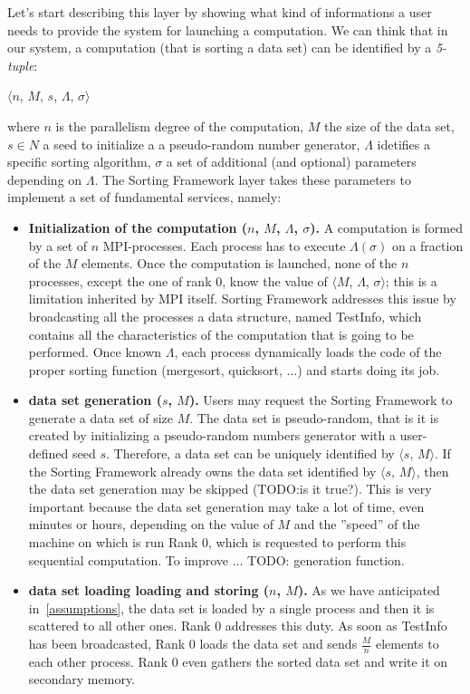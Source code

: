 Let's start describing this layer by showing what kind of informations a user needs to provide the system for launching a computation. We can think that in our system, a computation (that is sorting a data set) can be identified by a \textit{5-tuple}:
\begin{center}
$\langle n$, $M$, $s$, $\Lambda$, $\sigma \rangle$
\end{center} 
where $n$ is the parallelism degree of the computation, $M$ the size of the data set, $s \in N$ a seed to initialize a a pseudo-random number generator, $\Lambda$ idetifies a specific sorting algorithm, $\sigma$ a set of additional (and optional) parameters depending on $\Lambda$.
The Sorting Framework layer takes these parameters to implement a set of fundamental services, namely: 
\begin{itemize}
\item \textbf{Initialization of the computation ($n$, $M$, $\Lambda$, $\sigma$).} A computation is formed by a set of $n$ MPI-processes. Each process has to execute $\Lambda(\sigma)$ on a fraction of the $M$ elements. Once the computation is launched, none of the $n$ processes, except the one of rank $0$, know the value of $\langle M$, $\Lambda$, $\sigma \rangle$; this is a limitation inherited by MPI itself. Sorting Framework addresses this issue by broadcasting all the processes a data structure, named TestInfo, which contains all the characteristics of the computation that is going to be performed. Once known $\Lambda$, each process dynamically loads the code of the proper sorting function (mergesort, quicksort, ...) and starts doing its job.  
\item \textbf{data set generation ($s$, $M$).} Users may request the Sorting Framework to generate a data set of size $M$. The data set is pseudo-random, that is it is created by initializing a pseudo-random numbers generator with a user-defined seed $s$. Therefore, a data set can be uniquely identified by $\langle s$, $M \rangle$. If the Sorting Framework already owns the data set identified by $\langle s$, $M \rangle$, then the data set generation may be skipped (TODO:is it true?). This is very important because the data set generation may take a lot of time, even minutes or hours, depending on the value of $M$ and the ''speed'' of the machine on which is run Rank $0$, which is requested to perform this sequential computation. To improve ... TODO: generation function.
\item \textbf{data set loading loading and storing ($n$, $M$).} As we have anticipated in~\ref{assumptions}, the data set is loaded by a single process and then it is scattered to all other ones. Rank $0$ addresses this duty. As soon as TestInfo has been broadcasted, Rank $0$ loads the data set and sends $\frac{M}{n}$ elements to each other process. Rank $0$ even gathers the sorted data set and write it on secondary memory.

\end{itemize}
